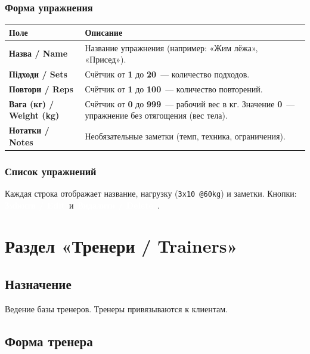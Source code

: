 \documentclass[12pt,a4paper]{article}
\newcommand{\btn}[2][primary]{%
  \textcolor{white}{\colorbox{#1}{\small\bfseries\,#2\,}}%
}
\newcommand{\btnred}[1]{\btn[danger]{#1}}
\begin{document}
\subsubsection{Форма упражнения}

\begin{center}
\begin{tabularx}{0.9\textwidth}{>{\bfseries}lX}
  \toprule
  Поле & Описание \\
  \midrule
  Назва / Name &
    Название упражнения (например: «Жим лёжа», «Присед»). \\
  Підходи / Sets &
    Счётчик от \textbf{1} до \textbf{20}~---
    количество подходов. \\
  Повтори / Reps &
    Счётчик от \textbf{1} до \textbf{100}~---
    количество повторений. \\
  Вага (кг) / Weight (kg) &
    Счётчик от \textbf{0} до \textbf{999}~---
    рабочий вес в кг. Значение \textbf{0}~---
    упражнение без отягощения (вес тела). \\
  Нотатки / Notes &
    Необязательные заметки (темп, техника, ограничения). \\
  \bottomrule
\end{tabularx}
\end{center}

\subsubsection{Список упражнений}

Каждая строка отображает название, нагрузку (\texttt{3x10 @60kg})
и заметки. Кнопки: \btn{Змінити / Edit} и \btnred{Видалити / Delete}.

\section{Раздел «Тренери / Trainers»}

\subsection{Назначение}

Ведение базы тренеров. Тренеры привязываются к клиентам.

\subsection{Форма тренера}
\end{document}
